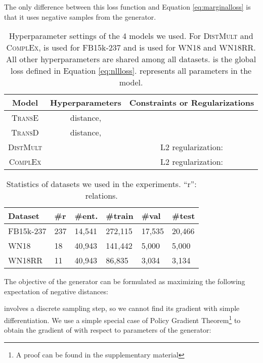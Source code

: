 \documentclass[11pt,a4paper]{article}
\begin{document}
The only difference between this loss function and Equation \ref{eq:marginalloss} is that it uses negative samples from the generator.

\begin{table*}[t]
\centering
\begin{tabular}{|c|c|c|}
\hline
\textbf{Model} & \textbf{Hyperparameters} & \textbf{Constraints or Regularizations}  \\ \hline
\textsc{TransE} &  distance,  &  \\ \hline
\textsc{TransD} &  distance,  &   \\ \hline
\textsc{DistMult} &  & L2 regularization:  \\ \hline
\textsc{ComplEx}  &  & L2 regularization:  \\ \hline
\end{tabular}
\caption{Hyperparameter settings of the 4 models we used. For \textsc{DistMult} and \textsc{ComplEx},  is used for FB15k-237 and  is used for WN18 and WN18RR. All other hyperparameters are shared among all datasets.  is the global loss defined in Equation \eqref{eq:nllloss}.  represents all parameters in the model.}
\label{tab:hyperparams}
\end{table*}

\begin{table}[t]
\small
\centering
\begin{tabular}{|l|l|l|l|l|l|}
\hline
\textbf{Dataset} & \textbf{\#r} & \textbf{\#ent.} & \textbf{\#train} & \textbf{\#val} & \textbf{\#test} \\ \hline
FB15k-237 & 237 & 14,541 & 272,115 & 17,535 & 20,466 \\ \hline
WN18 & 18 & 40,943 & 141,442 & 5,000 & 5,000 \\ \hline
WN18RR & 11 & 40,943 & 86,835 & 3,034 & 3,134 \\ \hline
\end{tabular}
\caption{Statistics of datasets we used in the experiments. ``r'': relations.}
\label{tab:datasets}
\end{table}

The objective of the generator can be formulated as maximizing the following expectation of negative distances:


 involves a discrete sampling step, so we cannot find its gradient with simple differentiation. We use a simple special case of Policy Gradient Theorem\footnote{A proof can be found in the supplementary material} \cite{policygradient} to obtain the gradient of  with respect to parameters of the generator:
\end{document}
